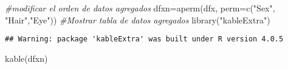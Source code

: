 \documentclass[
]{article}
\newenvironment{Shaded}{\begin{snugshade}}{\end{snugshade}}
\newcommand{\AttributeTok}[1]{\textcolor[rgb]{0.77,0.63,0.00}{#1}}
\newcommand{\CommentTok}[1]{\textcolor[rgb]{0.56,0.35,0.01}{\textit{#1}}}
\newcommand{\FunctionTok}[1]{\textcolor[rgb]{0.00,0.00,0.00}{#1}}
\newcommand{\NormalTok}[1]{#1}
\newcommand{\OtherTok}[1]{\textcolor[rgb]{0.56,0.35,0.01}{#1}}
\newcommand{\StringTok}[1]{\textcolor[rgb]{0.31,0.60,0.02}{#1}}
\begin{document}
\begin{Shaded}
\begin{Highlighting}[]
\CommentTok{\#modificar el orden de datos agregados}
\NormalTok{dfxn}\OtherTok{=}\FunctionTok{aperm}\NormalTok{(dfx, }\AttributeTok{perm=}\FunctionTok{c}\NormalTok{(}\StringTok{"Sex"}\NormalTok{, }\StringTok{"Hair"}\NormalTok{,}\StringTok{"Eye"}\NormalTok{))}
\CommentTok{\#Mostrar tabla de datos agregados}
\FunctionTok{library}\NormalTok{(}\StringTok{"kableExtra"}\NormalTok{)}
\end{Highlighting}
\end{Shaded}

\begin{verbatim}
## Warning: package 'kableExtra' was built under R version 4.0.5
\end{verbatim}

\begin{Shaded}
\begin{Highlighting}[]
\FunctionTok{kable}\NormalTok{(dfxn)}
\end{Highlighting}
\end{Shaded}
\end{document}
